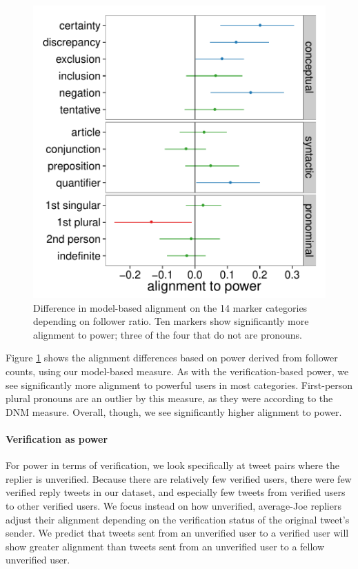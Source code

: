 \documentclass{acm_proc_article-sp}
\begin{document}
\begin{figure}[t]
\centering
\includegraphics[width=.9\columnwidth]{graphics/www2016_ourpowerdiff_fratio_final95.pdf}
\caption{Difference in model-based alignment on the 14 marker categories depending on follower ratio. Ten markers show significantly more alignment to power; three of the four that do not are pronouns.}\label{fig:our-fratio}
\end{figure}

Figure \ref{fig:our-fratio} shows the alignment differences based on power derived from follower counts, using our model-based measure.  As with the verification-based power, we see significantly more alignment to powerful users in most categories. First-person plural pronouns are an outlier by this measure, as they were according to the DNM measure.  Overall, though, we see significantly higher alignment to power.


\paragraph{Verification as power} For power in terms of verification, we look specifically at tweet pairs where the replier is unverified.  Because there are relatively few verified users, there were few verified reply tweets in our dataset, and especially few tweets from verified users to other verified users. We focus instead on how unverified, average-Joe repliers adjust their alignment depending on the verification status of the original tweet's sender.  We predict that tweets sent from an unverified user to a verified user will show greater alignment than tweets sent from an unverified user to a fellow unverified user.  
\end{document}
